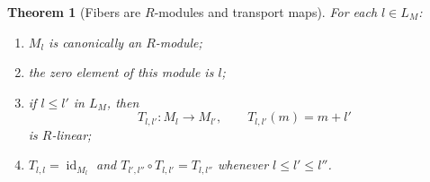 \documentclass[11pt]{article}
\newcommand{\id}{\operatorname{id}}
\newcommand{\1}{\mathbf 1}
\newtheorem{theorem}{Theorem}[section]
\numberwithin{equation}{section}
\begin{document}
\begin{theorem}[Fibers are $R$-modules and transport maps]\label{thm:fibers-modules}
For each $l\in L_M$:
\begin{enumerate}[label=\textup{(\arabic*)}]
\item $M_l$ is canonically an $R$-module;
\item the zero element of this module is $l$;
\item if $l\le l'$ in $L_M$, then
\begin{equation}
  T_{l,l'}:M_l\to M_{l'},
  \qquad
  T_{l,l'}(m)=m+l'
\end{equation}
is $R$-linear;
\item $T_{l,l}=\id_{M_l}$ and $T_{l',l''}\circ T_{l,l'}=T_{l,l''}$ whenever $l\le l'\le l''$.
\end{enumerate}
\end{theorem}
\end{document}
